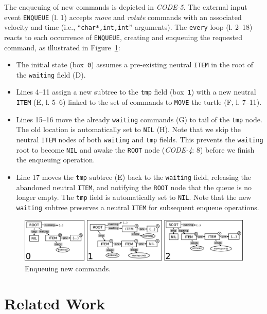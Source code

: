 \documentclass{sig-alternate}
\newcommand{\code}[1] {{\small{\texttt{#1}}}}
\newcommand{\MM}[1] {\textcircled{\tiny{\textsf{#1}}}}
\begin{document}
The enqueuing of new commands is depicted in \emph{CODE-5}.
The external input event \code{ENQUEUE} (l. 1) accepts \emph{move} and 
\emph{rotate} commands with an associated velocity and time (i.e., 
``\code{char*,int,int}'' arguments).
The \code{every} loop (l. 2--18) reacts to each occurrence of 
\code{ENQUEUE}, creating and enqueuing the requested command, as illustrated in 
Figure~\ref{fig.queue-2}: 
%
\begin{itemize}
%
\item The initial state (box~\code{0}) assumes a pre-existing neutral 
\code{ITEM} in the root of the \code{waiting} field (\MM{D}).
%
\item Lines 4--11 assign a new subtree to the \code{tmp} field (box~\code{1}) 
with a new neutral \code{ITEM} (\MM{E}, l. 5--6) linked to the set of 
commands to \code{MOVE} the turtle (\MM{F}, l. 7--11).
%
\item Lines 15--16 move the already \code{waiting} commands (\MM{G}) to 
tail of the \code{tmp} node.
The old location is automatically set to \code{NIL} (\MM{H}).
Note that we skip the neutral \code{ITEM} nodes of both \code{waiting} and 
\code{tmp} fields.
This prevents the \code{waiting} root to become \code{NIL} and awake the 
\code{ROOT} node (\emph{CODE-4}: 8) before we finish the enqueuing operation.
%
\item Line 17 moves the \code{tmp} subtree (\MM{E}) back to the 
\code{waiting} field, releasing the abandoned neutral \code{ITEM}, and 
notifying the \code{ROOT} node that the queue is no longer empty.
The \code{tmp} field is automatically set to \code{NIL}.
Note that the new \code{waiting} subtree preserves a neutral \code{ITEM} for 
subsequent enqueue operations.
%
\end{itemize}

\begin{figure}[t]
\centering
\includegraphics[scale=0.24]{queue-fig-2.eps}
\caption{
Enqueuing new commands.
\label{fig.queue-2}
}
\end{figure}

\section{Related Work}
\label{sec.related}
\end{document}
